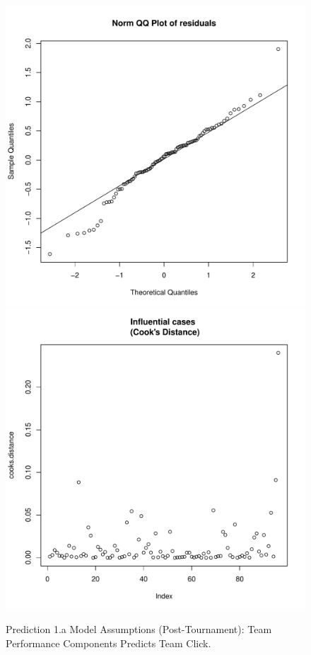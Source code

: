 \begin{CJK}{UTF8}{gbsn}
\begin{figure}[!htbp]
     \includegraphics[scale =.4]{images/MLM1aQQPlot.pdf}
     \includegraphics[scale =.4]{images/MLM1aCooksD.pdf}
     \caption{Prediction 1.a Model Assumptions (Post-Tournament): Team Performance Components Predicts Team Click.}
     \label{fig:MLM1aAssumptions}
 \end{figure}




\end{CJK}
